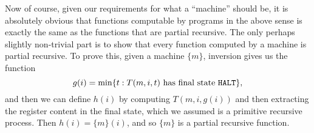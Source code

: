 \documentclass[a4paper]{article}
\begin{document}
Now of course, given our requirements for what a ``machine'' should be, it is absolutely obvious that functions computable by programs in the above sense is exactly the same as the functions that are partial recursive. The only perhaps slightly non-trivial part is to show that every function computed by a machine is partial recursive. To prove this, given a machine $\{m\}$, inversion gives us the function
\[
  g(i) = \min \{t: T(m, i, t) \text{ has final state \texttt{HALT}}\},
\]
and then we can define $h(i)$ by computing $T(m, i, g(i))$ and then extracting the register content in the final state, which we assumed is a primitive recursive process. Then $h(i) = \{m\}(i)$, and so $\{m\}$ is a partial recursive function. %

%
%
%
%
%
%
%
\end{document}
